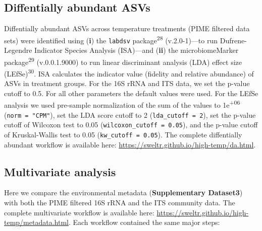 \documentclass[
  10pt,
  letterpaper,
  DIV=11,
  numbers=noendperiod]{scrartcl}
\begin{document}
\hypertarget{diffentially-abundant-asvs}{%
\subsection{Diffentially abundant
ASVs}\label{diffentially-abundant-asvs}}

Diffentially abundant ASVs across temperature treatments (PIME filtered
data sets) were identified using (\textbf{i}) the \texttt{labdsv}
package\textsuperscript{28} (v.2.0-1)---to run Dufrene-Legendre
Indicator Species Analysis (ISA)---and (\textbf{ii}) the
microbiomeMarker package\textsuperscript{29} (v.0.0.1.9000) to run
linear discriminant analysis (LDA) effect size
(LEfSe)\textsuperscript{30}. ISA calculates the indicator value
(fidelity and relative abundance) of ASVs in treatment groups. For the
16S rRNA and ITS data, we set the p-value cutoff to 0.5. For all other
parameters the default values were used. For the LEfSe analysis we used
pre-sample normalization of the sum of the values to
1e\textsuperscript{+06} (\texttt{norm\ =\ "CPM"}), set the LDA score
cutoff to 2 (\texttt{lda\_cutoff\ =\ 2}), set the p-value cutoff of
Wilcoxon test to 0.05 (\texttt{wilcoxon\_cutoff\ =\ 0.05}), and the
p-value cutoff of Kruskal-Wallis test to 0.05
(\texttt{kw\_cutoff\ =\ 0.05}). The complete diffentially abundant
workflow is available here:
\url{https://sweltr.github.io/high-temp/da.html}.

\hypertarget{multivariate-analysis}{%
\subsection{Multivariate analysis}\label{multivariate-analysis}}

Here we compare the environmental metadata (\textbf{Supplementary
Dataset3}) with both the PIME filtered 16S rRNA and the ITS community
data. The complete multivariate workflow is available here:
\url{https://sweltr.github.io/high-temp/metadata.html}. Each workflow
contained the same major steps:
\end{document}
